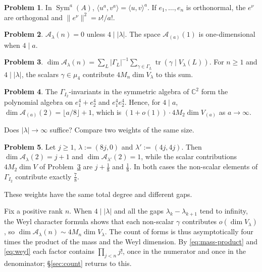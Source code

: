\documentclass[reqno]{amsart}
\theoremstyle{definition}
\newtheorem{problem}{Problem}[section]
\theoremstyle{plain}
\newcommand{\C}{\mathbb{C}}
\newcommand{\Ac}{\mathcal{A}}
\newcommand{\Sym}{\operatorname{Sym}}
\newcommand{\tr}{\operatorname{tr}}
\begin{document}
\begin{problem}\label{pr:sym-norm}
In \(\Sym^a(A)\), \(\langle u^a, v^a \rangle = \langle u, v \rangle^a\).  If \(e_1, \dots, e_n\) is orthonormal, the \(e^\nu\) are orthogonal and \(\lVert e^\nu \rVert^2 = \nu!/a!\).
\end{problem}

\begin{problem}\label{pr:forms-small}
\(\Ac_\lambda(n) = 0\) unless \(4 \mid \lvert\lambda\rvert\).  The space \(\Ac_{(a)}(1)\) is one-dimensional when \(4 \mid a\).
\end{problem}

\begin{problem}\label{pr:dim-forms}
\(\dim \Ac_\lambda(n) = \sum_{L} \lvert\Gamma_L\rvert^{-1} \sum_{\gamma \in \Gamma_L} \tr(\gamma \mid V_\lambda(L))\).  For \(n \ge 1\) and \(4 \mid \lvert\lambda\rvert\), the scalars \(\gamma \in \mu_4\) contribute \(4 M_n \dim V_\lambda\) to this sum.
\end{problem}

\begin{problem}\label{pr:forms-2}
The \(\Gamma_{I_2}\)-invariants in the symmetric algebra of \(\C^2\) form the polynomial algebra on \(e_1^4 + e_2^4\) and \(e_1^4 e_2^4\).  Hence, for \(4 \mid a\), \(\dim \Ac_{(a)}(2) = \lfloor a/8 \rfloor + 1\), which is \((1 + o(1)) \cdot 4 M_2 \dim V_{(a)}\) as \(a \to \infty\).
\end{problem}

Does \(\lvert\lambda\rvert \to \infty\) suffice?  Compare two weights of the same size.

\begin{problem}\label{pr:two-weights}
Let \(j \ge 1\), \(\lambda := (8j, 0)\) and \(\lambda' := (4j, 4j)\).  Then \(\dim \Ac_\lambda(2) = j + 1\) and \(\dim \Ac_{\lambda'}(2) = 1\), while the scalar contributions \(4 M_2 \dim V\) of Problem~\ref{pr:dim-forms} are \(j + \frac18\) and \(\frac18\).  In both cases the non-scalar elements of \(\Gamma_{I_2}\) contribute exactly \(\frac78\).
\end{problem}

These weights have the same total degree and different gaps.

Fix a positive rank \(n\).  When \(4 \mid \lvert\lambda\rvert\) and all the gaps \(\lambda_k - \lambda_{k+1}\) tend to infinity, the Weyl character formula shows that each non-scalar \(\gamma\) contributes \(o(\dim V_\lambda)\), so \(\dim \Ac_\lambda(n) \sim 4 M_n \dim V_\lambda\).  The count of forms is thus asymptotically four times the product of the mass and the Weyl dimension.  By \eqref{eq:mass-product} and \eqref{eq:weyl} each factor contains \(\prod_{j<n} j!\), once in the numerator and once in the denominator; \S\ref{sec:count} returns to this.
\end{document}
